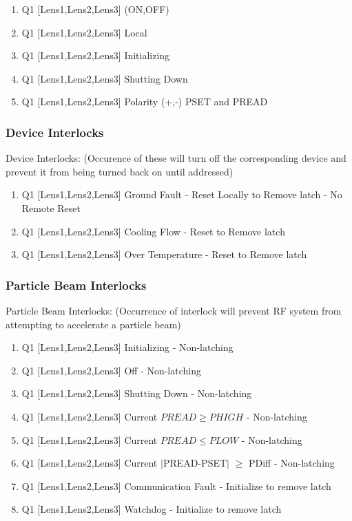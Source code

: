 \documentclass[11pt]{book}		%
\begin{document}
\begin{enumerate}
 \item Q1 [Lens1,Lens2,Lens3] (ON,OFF)
 \item Q1 [Lens1,Lens2,Lens3] Local
 \item Q1 [Lens1,Lens2,Lens3] Initializing
 \item Q1 [Lens1,Lens2,Lens3] Shutting Down
 \item Q1 [Lens1,Lens2,Lens3] Polarity (+,-) PSET and PREAD
\end{enumerate}

\subsubsection{Device Interlocks}\label{sect:cyc-op-interface-status-beamline-tofc1-state-monitors-device-interlocks}

Device Interlocks:
(Occurence of these will turn off the corresponding device and prevent it from being turned back on until addressed)

\begin{enumerate}
 \item Q1 [Lens1,Lens2,Lens3] Ground Fault - Reset Locally to Remove latch - No Remote Reset
 \item Q1 [Lens1,Lens2,Lens3] Cooling Flow - Reset to Remove latch
 \item Q1 [Lens1,Lens2,Lens3] Over Temperature - Reset to Remove latch
\end{enumerate}

\subsubsection{Particle Beam Interlocks}\label{sect:cyc-op-interface-status-beamline-tofc1-state-monitors-beam-interlocks}

Particle Beam Interlocks:
(Occurrence of interlock will prevent RF system from attempting to accelerate a particle beam)

\begin{enumerate}
 \item Q1 [Lens1,Lens2,Lens3] Initializing - Non-latching
 \item Q1 [Lens1,Lens2,Lens3] Off - Non-latching
 \item Q1 [Lens1,Lens2,Lens3] Shutting Down - Non-latching
 \item Q1 [Lens1,Lens2,Lens3] Current $PREAD \geq PHIGH$ - Non-latching
 \item Q1 [Lens1,Lens2,Lens3] Current $PREAD \leq PLOW$ - Non-latching
 \item Q1 [Lens1,Lens2,Lens3] Current $\mid$PREAD-PSET$\mid$  $\geq$ PDiff - Non-latching
 \item Q1 [Lens1,Lens2,Lens3] Communication Fault - Initialize to remove latch
 \item Q1 [Lens1,Lens2,Lens3] Watchdog - Initialize to remove latch
\end{enumerate}
\end{document}
